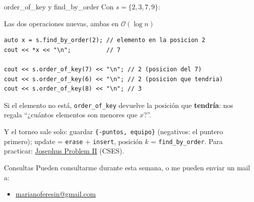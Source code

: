 \documentclass{beamer}
\begin{document}
\begin{frame}[fragile]{order\_of\_key y find\_by\_order}
    Con $s = \{2, 3, 7, 9\}$:
    \begin{block}{Las dos operaciones nuevas, ambas en $\mathcal{O}(\log n)$}
    \footnotesize
\begin{verbatim}
auto x = s.find_by_order(2); // elemento en la posicion 2
cout << *x << "\n";          // 7

cout << s.order_of_key(7) << "\n"; // 2 (posicion del 7)
cout << s.order_of_key(6) << "\n"; // 2 (posicion que tendria)
cout << s.order_of_key(8) << "\n"; // 3
\end{verbatim}
    \end{block}

    \vspace{0.1cm}
    Si el elemento no está, \texttt{order\_of\_key} devuelve la posición que
    \textbf{tendría}: nos regala ``¿cuántos elementos son menores que $x$?''.

    \vspace{0.1cm}
    Y el torneo sale solo: guardar \texttt{\{-puntos, equipo\}} (negativos:
    el puntero primero); update = \texttt{erase} + \texttt{insert}, posición
    $k$ = \texttt{find\_by\_order}. Para practicar:
    \href{https://cses.fi/problemset/task/2163}{Josephus Problem II} (CSES).
\end{frame}


\begin{frame}{Consultas}
Pueden consultarme durante esta semana, o me pueden enviar un mail a:
        \begin{itemize}
            \item \href{mailto:marianoferesin@gmail.com}{marianoferesin@gmail.com}
        \end{itemize}
\end{frame}
\end{document}
